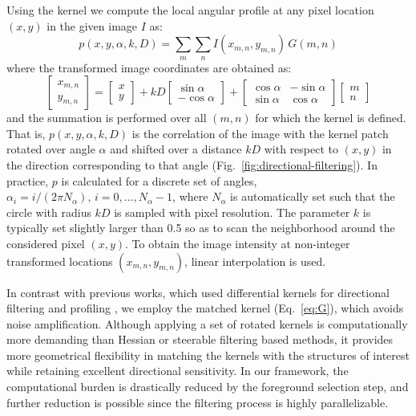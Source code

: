 \documentclass[twocolumn,natbib]{svjour3}
\begin{document}
Using the kernel we compute the local angular profile at any pixel location $(x,y)$ in the given image $I$ as:
\begin{equation}
p(x,y,\alpha,k,D)=\sum_{m}\sum_{n} I(x_{m,n},y_{m,n})\,G(m,n)
\label{eq:angularprofile}
\end{equation}
where the transformed image coordinates are obtained as:
\begin{equation}
\begin{bmatrix} x_{m,n} \\ y_{m,n} \end{bmatrix} =
\begin{bmatrix} x \\ y \end{bmatrix} +
kD\begin{bmatrix} \sin\alpha \\ -\!\cos\alpha \end{bmatrix} +
\begin{bmatrix} \cos\alpha & -\!\sin\alpha \\ \sin\alpha & \cos\alpha \end{bmatrix}
\begin{bmatrix} m \\ n \end{bmatrix}
\label{eq:xymn}
\end{equation}
and the summation is performed over all $(m,n)$ for which the kernel is defined. That is, $p(x,y,\alpha,k,D)$ is the correlation of the image with the kernel patch rotated over angle $\alpha$ and shifted over a distance $kD$ with respect to $(x,y)$ in the direction corresponding to that angle (Fig.~\ref{fig:directional-filtering}). In practice, $p$ is calculated for a discrete set of angles, $\alpha_{i}=i/(2\pi N_{\alpha}),\, i=0,\dots,N_{\alpha}-1$, where $N_{\alpha}$ is automatically set such that the circle with radius $kD$ is sampled with pixel resolution. The parameter $k$ is typically set slightly larger than 0.5 so as to scan the neighborhood around the considered pixel $(x,y)$. To obtain the image intensity at non-integer transformed locations $(x_{m,n},y_{m,n})$, linear interpolation is used.

In contrast with previous works, which used differential kernels for directional filtering and profiling \citep{yu1998rotated, can1999rapid, zhang2007automated}, we employ the matched kernel (Eq.~\ref{eq:G}), which avoids noise amplification. Although applying a set of rotated kernels is computationally more demanding than Hessian or steerable filtering based methods, it provides more geometrical flexibility in matching the kernels with the structures of interest while retaining excellent directional sensitivity. In our framework, the computational burden is drastically reduced by the foreground selection step, and further reduction is possible since the filtering process is highly parallelizable.
\end{document}
